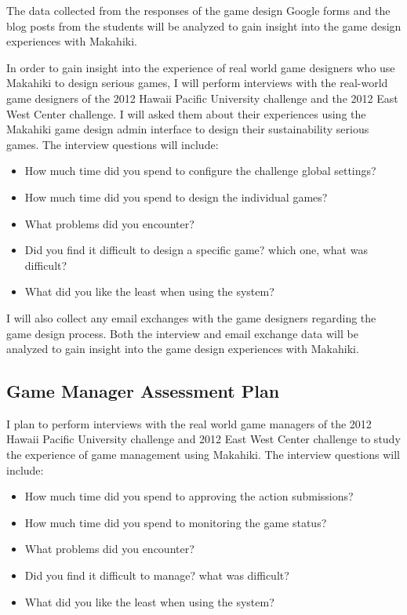 The data collected from the responses of the game design Google forms and the blog posts from the students will be analyzed to gain insight into the game design experiences with Makahiki.

In order to gain insight into the experience of real world game designers who use Makahiki to design serious games, I will perform interviews with the real-world game designers of the 2012 Hawaii Pacific University challenge and the 2012 East West Center challenge. I will asked them about their experiences using the Makahiki game design admin interface to design their sustainability serious games. The interview questions will include:
\begin{itemize}
    \item How much time did you spend to configure the challenge global settings?
    \item How much time did you spend to design the individual games?
    \item What problems did you encounter?
    \item Did you find it difficult to design a specific game? which one, what was difficult?
    \item What did you like the least when using the system?
\end{itemize}

I will also collect any email exchanges with the game designers regarding the game design process. Both the interview and email exchange data will be analyzed to gain insight into the game design experiences with Makahiki.

\subsection{Game Manager Assessment Plan}

I plan to perform interviews with the real world game managers of the 2012 Hawaii Pacific University challenge and 2012 East West Center challenge to study the experience of game management using Makahiki. The interview questions will include:
\begin{itemize}
\item How much time did you spend to approving the action submissions?
\item How much time did you spend to monitoring the game status?
\item What problems did you encounter?
\item Did you find it difficult to manage? what was difficult?
\item What did you like the least when using the system?
\end{itemize}

